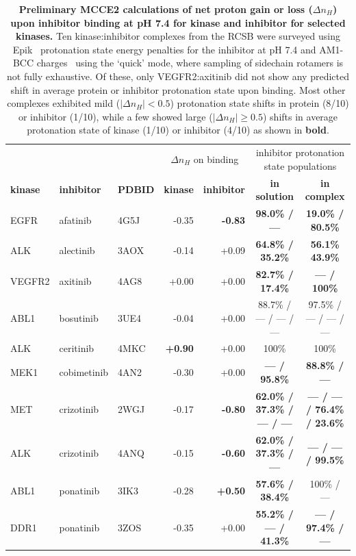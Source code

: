 \documentclass[11pt]{article}
\begin{document}
\begin{table}[H]
\begin{tabularx}{\textwidth}{lllrrcc}
\hline
& & & \multicolumn{2}{c}{$\Delta n_H$ on binding}  & \multicolumn{2}{c}{inhibitor protonation state populations} \\
  \textbf{kinase} & \textbf{inhibitor} & \textbf{PDBID} & \textbf{kinase} & \textbf{inhibitor} &  \textbf{in solution} & \textbf{in complex} \\
\hline
EGFR & afatinib & 4G5J & -0.35 & {\bf -0.83} & \bf 98.0\% / --- & \bf 19.0\% / 80.5\% \\
ALK & alectinib & 3AOX & -0.14 & +0.09 & \bf 64.8\% / 35.2\% & \bf 56.1\% 43.9\% \\
VEGFR2 & axitinib & 4AG8 & +0.00 & +0.00 & \bf 82.7\% / 17.4\% & \bf --- / 100\%\\
ABL1 & bosutinib & 3UE4 & -0.04 & +0.00 & 88.7\% / --- / --- / --- & 97.5\% / --- / --- / ---\\
ALK & ceritinib & 4MKC & {\bf +0.90} & +0.00 & 100\% & 100\% \\
MEK1 & cobimetinib & 4AN2 & -0.30 & +0.00 & \bf --- / 95.8\% & \bf 88.8\% / --- \\
MET & crizotinib & 2WGJ & -0.17 & {\bf -0.80} & \bf 62.0\% / 37.3\% / --- / --- & \bf --- / --- / 76.4\% / 23.6\% \\
ALK & crizotinib & 4ANQ & -0.15 & {\bf -0.60} & \bf 62.0\% / 37.3\% / --- & \bf --- / --- / 99.5\% \\
ABL1 & ponatinib & 3IK3 & -0.28 & {\bf +0.50} & \bf 57.6\% / 38.4\% & 100\% / --- \\
DDR1 & ponatinib & 3ZOS & -0.35 & +0.00 & \bf 55.2\% / --- / 41.3\% & \bf --- / 97.4\% / ---\\
\hline
\end{tabularx}
\caption{{\bf Preliminary MCCE2 calculations of net proton gain or loss ($\Delta n_{H}$) upon inhibitor binding at pH 7.4 for kinase and inhibitor for selected kinases.}
Ten kinase:inhibitor complexes from the RCSB were surveyed using Epik~\cite{uchiyama:jcamd:2007:epik} protonation state energy penalties for the inhibitor at pH 7.4 and AM1-BCC charges~\cite{am1bcc1,am1bcc2} using the `quick' mode, where sampling of sidechain rotamers is not fully exhaustive.  
Of these, only VEGFR2:axitinib did not show any predicted shift in average protein or inhibitor protonation state upon binding.
Most other complexes exhibited mild ($|\Delta n_{H}| <0.5$) protonation state shifts in protein (8/10) or inhibitor (1/10), while a few showed large ($|\Delta n_H| \ge 0.5$) shifts in average protonation state of kinase (1/10) or inhibitor (4/10) as shown in {\bf bold}.
}
\end{table}
\end{document}

